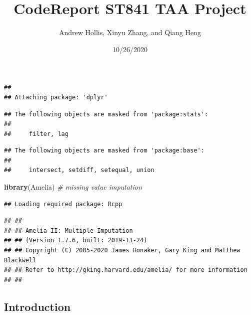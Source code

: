 \documentclass[
]{article}
\title{CodeReport ST841 TAA Project}
\author{Andrew Hollis, Xinyu Zhang, and Qiang Heng}
\date{10/26/2020}
\newenvironment{Shaded}{\begin{snugshade}}{\end{snugshade}}
\newcommand{\CommentTok}[1]{\textcolor[rgb]{0.56,0.35,0.01}{\textit{#1}}}
\newcommand{\DataTypeTok}[1]{\textcolor[rgb]{0.13,0.29,0.53}{#1}}
\newcommand{\KeywordTok}[1]{\textcolor[rgb]{0.13,0.29,0.53}{\textbf{#1}}}
\newcommand{\NormalTok}[1]{#1}
\newcommand{\OperatorTok}[1]{\textcolor[rgb]{0.81,0.36,0.00}{\textbf{#1}}}
\newcommand{\OtherTok}[1]{\textcolor[rgb]{0.56,0.35,0.01}{#1}}
\begin{document}
\maketitle

\begin{Shaded}
\end{Shaded}

\begin{verbatim}
## 
## Attaching package: 'dplyr'
\end{verbatim}

\begin{verbatim}
## The following objects are masked from 'package:stats':
## 
##     filter, lag
\end{verbatim}

\begin{verbatim}
## The following objects are masked from 'package:base':
## 
##     intersect, setdiff, setequal, union
\end{verbatim}

\begin{Shaded}
\begin{Highlighting}[]
\KeywordTok{library}\NormalTok{(Amelia) }\CommentTok{# missing value imputation}
\end{Highlighting}
\end{Shaded}

\begin{verbatim}
## Loading required package: Rcpp
\end{verbatim}

\begin{verbatim}
## ## 
## ## Amelia II: Multiple Imputation
## ## (Version 1.7.6, built: 2019-11-24)
## ## Copyright (C) 2005-2020 James Honaker, Gary King and Matthew Blackwell
## ## Refer to http://gking.harvard.edu/amelia/ for more information
## ##
\end{verbatim}

\hypertarget{introduction}{%
\subsection{Introduction}\label{introduction}}
\end{document}
